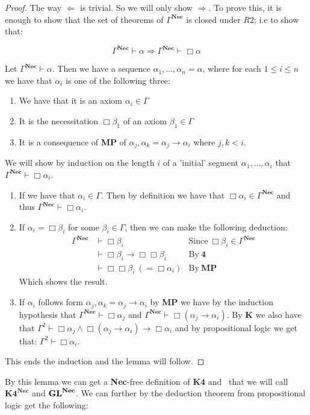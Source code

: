 \documentclass[../main.tex]{subfiles}
\begin{document}
\begin{proof}
	The way $\Leftarrow$ is trivial. So we will only show $\Rightarrow$.
	To prove this, it is enough to show that the set of theorems of
	$\Gamma^{\textbf{Nec}}$ is closed under $R2$; i.e to show that:

	$$\Gamma^{\textbf{Nec}}\vdash\alpha\Rightarrow\Gamma^{\textbf{Nec}}\vdash\Box\alpha$$

	Let $\Gamma^{\textbf{Nec}}\vdash\alpha$. Then we have a sequence
	$\alpha_1,\ldots,\alpha_n=\alpha$, where for each $1\leq i\leq n$ we
	have that $\alpha_i$ is one of the following three:
	\begin{enumerate}
		\item We have that it is an axiom $\alpha_i\in\Gamma$ 
		\item It is the necessitation  $\Box\beta_1$ of an axiom
			$\beta_1\in\Gamma$
		\item It is a consequence of \textbf{MP} of
			$\alpha_j,\alpha_k=\alpha_j\rightarrow\alpha_i$
			where $j,k<i$.
	\end{enumerate}
	We will show  by induction on the length $i$ of a 'initial' segment
	$\alpha_1,\ldots,\alpha_i$ that $\Gamma^{\textbf{Nec}}\vdash \Box\alpha_i$. 
	\begin{enumerate}
		\item If we have that $\alpha_i\in\Gamma$. Then by definition
			we have that $\Box\alpha_i\in\Gamma^{\textbf{Nec}}$ and thus
			$\Gamma^{\textbf{Nec}}\vdash\Box\alpha_i$.
		\item If $\alpha_i=\Box\beta_i$ for some $\beta_i\in\Gamma$,
			then we can make the following deduction:
			\begin{align*}
				\Gamma^{\textbf{Nec}}&\vdash\Box\beta_i &\text{Since}\
				\Box\beta_i\in\Gamma^{\textbf{Nec}}\\
					&\vdash\Box\beta_i\rightarrow\Box\Box\beta_i
					&\text{By}\ \textbf{4}\\
					&\vdash\Box\Box\beta_i\ (=\Box\alpha_i) 
					&\text{By}\ \textbf{MP}
			\end{align*}
			Which shows the result.
		\item If $\alpha_i$ follows form
			$\alpha_j,\alpha_k=\alpha_j\rightarrow\alpha_i$ by
			\textbf{MP} we have by the induction hypothesis that
			$\Gamma^{\textbf{Nec}}\vdash\Box\alpha_j$ and
			$\Gamma^{\textbf{Nec}}\vdash\Box(\alpha_j\rightarrow\alpha_i)$. By
			\textbf{K} we also have that
			$\Gamma^2\vdash\Box\alpha_j\wedge\Box(\alpha_j\rightarrow\alpha_i)\rightarrow\Box\alpha_i$
			and by propositional logic we get that:
			$\Gamma^2\vdash\Box\alpha_i$.
	\end{enumerate}
	This ends the induction and the lemma will follow.
\end{proof}
By this lemma we can get a \textbf{Nec}-free definition of \textbf{K4} and \GL\  that we will call
$\textbf{K4}^{\textbf{Nec}}$ and $\text{\textbf{GL}}^{\textbf{Nec}}$. We can further by the deduction theorem from propositional logic get
the following:
\end{document}
